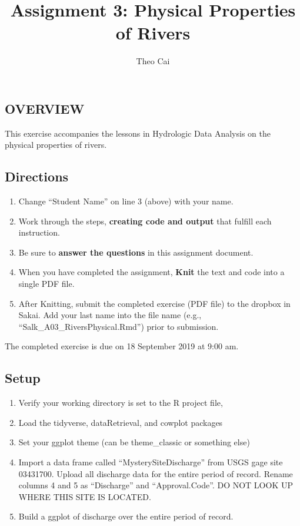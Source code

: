 \documentclass[]{article}
\title{Assignment 3: Physical Properties of Rivers}
\author{Theo Cai}
\date{}
\providecommand{\tightlist}{%
  \setlength{\itemsep}{0pt}\setlength{\parskip}{0pt}}
\begin{document}
\maketitle

\hypertarget{overview}{%
\subsection{OVERVIEW}\label{overview}}

This exercise accompanies the lessons in Hydrologic Data Analysis on the
physical properties of rivers.

\hypertarget{directions}{%
\subsection{Directions}\label{directions}}

\begin{enumerate}
\def\labelenumi{\arabic{enumi}.}
\tightlist
\item
  Change ``Student Name'' on line 3 (above) with your name.
\item
  Work through the steps, \textbf{creating code and output} that fulfill
  each instruction.
\item
  Be sure to \textbf{answer the questions} in this assignment document.
\item
  When you have completed the assignment, \textbf{Knit} the text and
  code into a single PDF file.
\item
  After Knitting, submit the completed exercise (PDF file) to the
  dropbox in Sakai. Add your last name into the file name (e.g.,
  ``Salk\_A03\_RiversPhysical.Rmd'') prior to submission.
\end{enumerate}

The completed exercise is due on 18 September 2019 at 9:00 am.

\hypertarget{setup}{%
\subsection{Setup}\label{setup}}

\begin{enumerate}
\def\labelenumi{\arabic{enumi}.}
\tightlist
\item
  Verify your working directory is set to the R project file,
\item
  Load the tidyverse, dataRetrieval, and cowplot packages
\item
  Set your ggplot theme (can be theme\_classic or something else)
\item
  Import a data frame called ``MysterySiteDischarge'' from USGS gage
  site 03431700. Upload all discharge data for the entire period of
  record. Rename columns 4 and 5 as ``Discharge'' and ``Approval.Code''.
  DO NOT LOOK UP WHERE THIS SITE IS LOCATED.
\item
  Build a ggplot of discharge over the entire period of record.
\end{enumerate}
\end{document}
